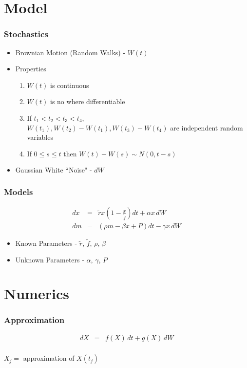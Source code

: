 
\section{Model}

\begin{frame}
    \frametitle{Stochastics}
	\begin{itemize}
		\item Brownian Motion (Random Walks) - $W(t)$
		\item Properties
	\begin{enumerate}[i]
		\item $W(t)$ is continuous
		\item $W(t)$ is no where differentiable
		\item If $t_{1}<t_{2}<t_{3}<t_{4}$, \\
			$W(t_{1}), W(t_{2})-W(t_{1}),  W(t_{3})-W(t_{4})$ are independent random variables
		\item If $0 \le s\le t$ then $W(t)-W(s) \sim N(0, t-s)$
	\end{enumerate}
		\item Gaussian White ``Noise" - $dW$
	\end{itemize}
\end{frame}



\begin{frame}
    \frametitle{Models}
	\begin{eqnarray}
		dx &=& \tilde{r} x \left( 1- \frac{x}{\tilde{f}}\right) dt +\alpha x \, dW \\
		dm &=& ( \rho m - \beta x + P) dt - \gamma x \, dW
	\end{eqnarray}
	\begin{itemize}
		\item Known Parameters - $\tilde{r}$, $\tilde{f}$, $\rho$, $\beta$
		\item Unknown Parameters - $\alpha$, $\gamma$, $P$
	\end{itemize}
\end{frame}




\section{Numerics}

\begin{frame}
   \frametitle{Approximation}
	\begin{eqnarray*}
		dX &=& f(X) \, dt + g(X) \, dW \\
	\end{eqnarray*}
	\begin{center}
		$X_{j} =$ approximation of $X(t_{j})$
	\end{center}
\end{frame}



